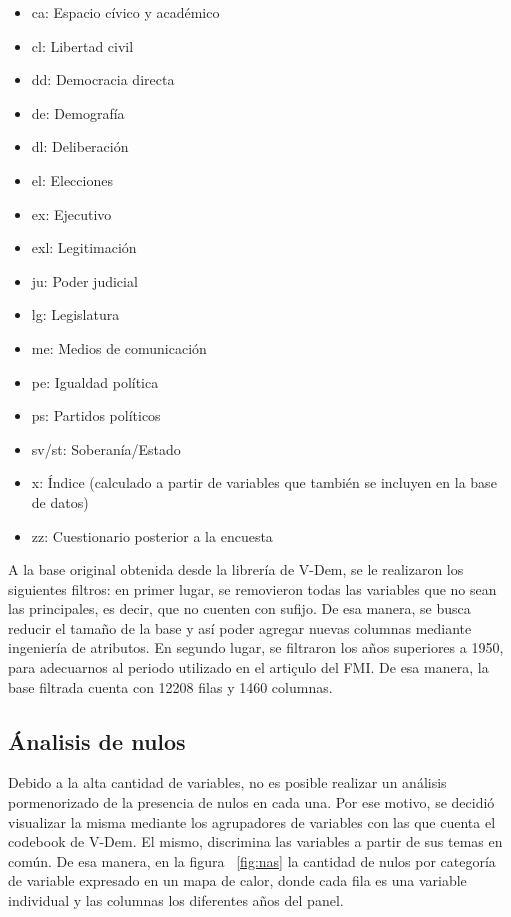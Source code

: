 \documentclass{article}
\begin{document}
\begin{itemize}
  \item ca: Espacio cívico y académico
  \item cl: Libertad civil
  \item dd: Democracia directa
  \item de: Demografía
  \item dl: Deliberación
  \item el: Elecciones
  \item ex: Ejecutivo
  \item exl: Legitimación
  \item ju: Poder judicial
  \item lg: Legislatura
  \item me: Medios de comunicación
  \item pe: Igualdad política
  \item ps: Partidos políticos
  \item sv/st: Soberanía/Estado
  \item x: Índice (calculado a partir de variables que también se 
  incluyen en la base de datos)
  \item zz: Cuestionario posterior a la encuesta
\end{itemize}

A la base original obtenida desde la librería de V-Dem, se le realizaron los
siguientes filtros: en primer lugar, se removieron todas las variables que
no sean las principales, es decir, que no cuenten con sufijo. De esa manera,
se busca reducir el tamaño de la base y así poder agregar nuevas columnas
mediante ingeniería de atributos. En segundo lugar, se filtraron los años 
superiores a 1950, para adecuarnos al periodo utilizado en el artiçulo del FMI.
De esa manera, la base filtrada cuenta con 12208 filas y 1460 columnas.

\subsection{Ánalisis de nulos}
Debido a la alta cantidad de variables, no es posible realizar un análisis
pormenorizado de la presencia de nulos en cada una. Por ese motivo, se decidió
visualizar la misma mediante los agrupadores de variables con las que cuenta el
codebook de V-Dem. El mismo, discrimina las variables a partir de sus temas en 
común. De esa manera, en la figura ~\ref{fig:nas} la cantidad de nulos por 
categoría de variable expresado en un mapa de calor, donde cada fila es una 
variable individual y las columnas los diferentes años del panel.
\end{document}
